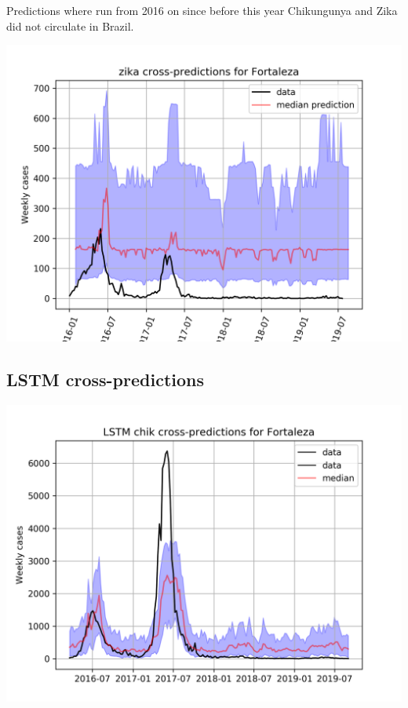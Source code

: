 \documentclass[a0,portrait]{a0poster}
\begin{document}
\begin{multicols}{3}
Predictions where run from 2016 on since before this year Chikungunya and Zika 
did not circulate in Brazil. 

\begin{center}
\includegraphics[width=0.8\linewidth]{figures/qf_zika_cross_Fortaleza}
\label{fig:zika_fortaleza}
\end{center}

\subsection*{LSTM cross-predictions}

\begin{center}
\includegraphics[width=0.8\linewidth]{figures/lstm_chik_cross_Fortaleza.png} 
\label{fig:lstm_chik_fortaleza}
\end{center}%


\end{multicols}
\end{document}
